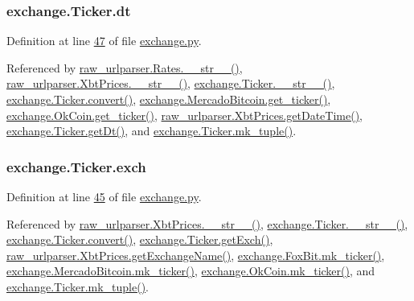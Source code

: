 \subsubsection[{\texorpdfstring{dt}{dt}}]{\setlength{\rightskip}{0pt plus 5cm}exchange.\+Ticker.\+dt}\hypertarget{classexchange_1_1_ticker_a45e3162d9956cee797f21d93c44c6baf}{}\label{classexchange_1_1_ticker_a45e3162d9956cee797f21d93c44c6baf}


Definition at line \hyperlink{exchange_8py_source_l00047}{47} of file \hyperlink{exchange_8py_source}{exchange.\+py}.



Referenced by \hyperlink{raw__urlparser_8py_source_l00038}{raw\+\_\+urlparser.\+Rates.\+\_\+\+\_\+str\+\_\+\+\_\+()}, \hyperlink{raw__urlparser_8py_source_l00074}{raw\+\_\+urlparser.\+Xbt\+Prices.\+\_\+\+\_\+str\+\_\+\+\_\+()}, \hyperlink{exchange_8py_source_l00099}{exchange.\+Ticker.\+\_\+\+\_\+str\+\_\+\+\_\+()}, \hyperlink{exchange_8py_source_l00055}{exchange.\+Ticker.\+convert()}, \hyperlink{exchange_8py_source_l00306}{exchange.\+Mercado\+Bitcoin.\+get\+\_\+ticker()}, \hyperlink{exchange_8py_source_l00371}{exchange.\+Ok\+Coin.\+get\+\_\+ticker()}, \hyperlink{raw__urlparser_8py_source_l00059}{raw\+\_\+urlparser.\+Xbt\+Prices.\+get\+Date\+Time()}, \hyperlink{exchange_8py_source_l00081}{exchange.\+Ticker.\+get\+Dt()}, and \hyperlink{exchange_8py_source_l00084}{exchange.\+Ticker.\+mk\+\_\+tuple()}.

\subsubsection[{\texorpdfstring{exch}{exch}}]{\setlength{\rightskip}{0pt plus 5cm}exchange.\+Ticker.\+exch}\hypertarget{classexchange_1_1_ticker_a33f33fe9a12da3ce52938afdc577c061}{}\label{classexchange_1_1_ticker_a33f33fe9a12da3ce52938afdc577c061}


Definition at line \hyperlink{exchange_8py_source_l00045}{45} of file \hyperlink{exchange_8py_source}{exchange.\+py}.



Referenced by \hyperlink{raw__urlparser_8py_source_l00074}{raw\+\_\+urlparser.\+Xbt\+Prices.\+\_\+\+\_\+str\+\_\+\+\_\+()}, \hyperlink{exchange_8py_source_l00099}{exchange.\+Ticker.\+\_\+\+\_\+str\+\_\+\+\_\+()}, \hyperlink{exchange_8py_source_l00055}{exchange.\+Ticker.\+convert()}, \hyperlink{exchange_8py_source_l00075}{exchange.\+Ticker.\+get\+Exch()}, \hyperlink{raw__urlparser_8py_source_l00068}{raw\+\_\+urlparser.\+Xbt\+Prices.\+get\+Exchange\+Name()}, \hyperlink{exchange_8py_source_l00245}{exchange.\+Fox\+Bit.\+mk\+\_\+ticker()}, \hyperlink{exchange_8py_source_l00320}{exchange.\+Mercado\+Bitcoin.\+mk\+\_\+ticker()}, \hyperlink{exchange_8py_source_l00385}{exchange.\+Ok\+Coin.\+mk\+\_\+ticker()}, and \hyperlink{exchange_8py_source_l00084}{exchange.\+Ticker.\+mk\+\_\+tuple()}.

